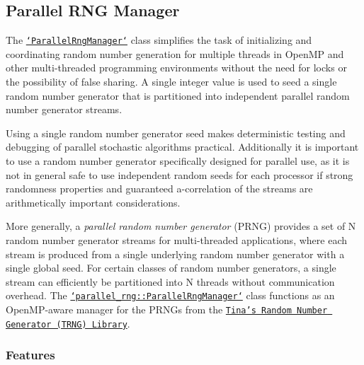 \href{https://travis-ci.org/markjolah/ParallelRngManager}{\tt } \subsection*{Parallel R\-N\-G Manager}

The \href{https://markjolah.github.io/ParallelRngManager/classparallel__rng_1_1ParallelRngManager.html}{\tt `\-Parallel\-Rng\-Manager`} class simplifies the task of initializing and coordinating random number generation for multiple threads in Open\-M\-P and other multi-\/threaded programming environments without the need for locks or the possibility of false sharing. A single integer value is used to seed a single random number generator that is partitioned into independent parallel random number generator streams.

Using a single random number generator seed makes deterministic testing and debugging of parallel stochastic algorithms practical. Additionally it is important to use a random number generator specifically designed for parallel use, as it is not in general safe to use independent random seeds for each processor if strong randomness properties and guaranteed a-\/correlation of the streams are arithmetically important considerations.

More generally, a {\itshape parallel random number generator} (P\-R\-N\-G) provides a set of N random number generator streams for multi-\/threaded applications, where each stream is produced from a single underlying random number generator with a single global seed. For certain classes of random number generators, a single stream can efficiently be partitioned into N threads without communication overhead. The \href{https://markjolah.github.io/ParallelRngManager/classparallel__rng_1_1ParallelRngManager.html}{\tt `parallel\-\_\-rng\-::\-Parallel\-Rng\-Manager`} class functions as an Open\-M\-P-\/aware manager for the P\-R\-N\-Gs from the \href{https://www.numbercrunch.de/trng/}{\tt Tina's Random Number Generator (T\-R\-N\-G) Library}.

\subsubsection*{Features}


